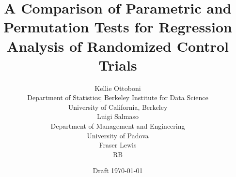 \documentclass[11pt]{article}
\begin{document}



\title{A Comparison of Parametric and Permutation Tests for Regression Analysis of Randomized Control Trials}
%

\author{Kellie Ottoboni \\
Department of Statistics; Berkeley Institute for Data Science\\
University of California, Berkeley\\ [.2in]
Luigi Salmaso\\
Department of Management and Engineering \\
University of Padova \\ [.2in]
Fraser Lewis \\
RB
}\date{Draft \today}
\maketitle
\end{document}
